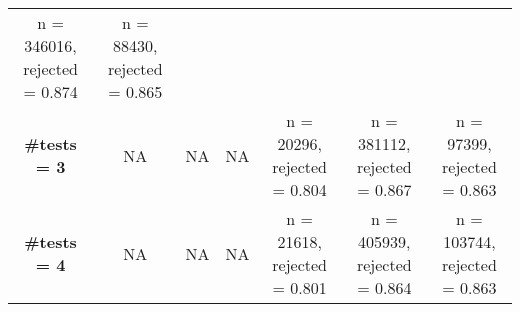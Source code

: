 \documentclass[
]{article}
\begin{document}
\begin{longtable}[]{@{}ccccccc@{}}
\begin{minipage}[t]{0.16\columnwidth}
n = 346016, rejected = 0.874\strut
\end{minipage} & \begin{minipage}[t]{0.16\columnwidth}\centering
n = 88430, rejected = 0.865\strut
\end{minipage}\tabularnewline
\begin{minipage}[t]{0.09\columnwidth}\centering
\textbf{\#tests = 3}\strut
\end{minipage} & \begin{minipage}[t]{0.08\columnwidth}\centering
NA\strut
\end{minipage} & \begin{minipage}[t]{0.08\columnwidth}\centering
NA\strut
\end{minipage} & \begin{minipage}[t]{0.08\columnwidth}\centering
NA\strut
\end{minipage} & \begin{minipage}[t]{0.15\columnwidth}\centering
n = 20296, rejected = 0.804\strut
\end{minipage} & \begin{minipage}[t]{0.16\columnwidth}\centering
n = 381112, rejected = 0.867\strut
\end{minipage} & \begin{minipage}[t]{0.16\columnwidth}\centering
n = 97399, rejected = 0.863\strut
\end{minipage}\tabularnewline
\begin{minipage}[t]{0.09\columnwidth}\centering
\textbf{\#tests = 4}\strut
\end{minipage} & \begin{minipage}[t]{0.08\columnwidth}\centering
NA\strut
\end{minipage} & \begin{minipage}[t]{0.08\columnwidth}\centering
NA\strut
\end{minipage} & \begin{minipage}[t]{0.08\columnwidth}\centering
NA\strut
\end{minipage} & \begin{minipage}[t]{0.15\columnwidth}\centering
n = 21618, rejected = 0.801\strut
\end{minipage} & \begin{minipage}[t]{0.16\columnwidth}\centering
n = 405939, rejected = 0.864\strut
\end{minipage} & \begin{minipage}[t]{0.16\columnwidth}\centering
n = 103744, rejected = 0.863\strut
\end{minipage}\tabularnewline

\end{longtable}
\end{document}
